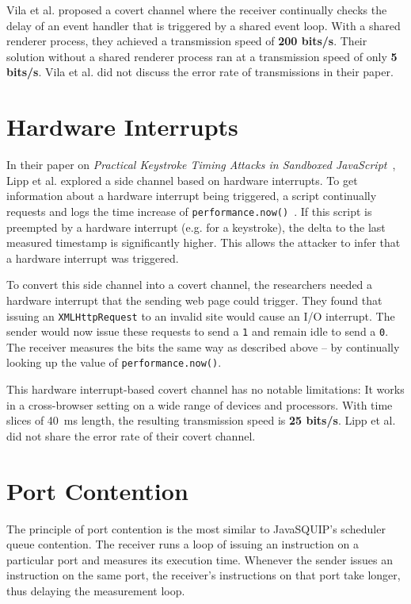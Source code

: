 \documentclass[11pt,
  titlepage=false,
  parskip=half,      %
]{scrreprt}
\begin{document}
Vila et al. proposed a covert channel where the receiver continually checks the delay of an event handler
that is triggered by a shared event loop.
With a shared renderer process, they achieved a transmission speed of \textbf{200 bits/s}.
Their solution without a shared renderer process ran at a transmission speed of only \textbf{5 bits/s}.
Vila et al. did not discuss the error rate of transmissions in their paper.

\section{Hardware Interrupts}
In their paper on \textit{Practical Keystroke Timing Attacks in Sandboxed JavaScript}~\cite{lipp2017practical},
Lipp et al. explored a side channel based on hardware interrupts.
To get information about a hardware interrupt being triggered,
a script continually requests and logs the time increase of \texttt{performance.now()}~\cite{performancenow}.
If this script is preempted by a hardware interrupt (e.g. for a keystroke),
the delta to the last measured timestamp is significantly higher.
This allows the attacker to infer that a hardware interrupt was triggered.

To convert this side channel into a covert channel,
the researchers needed a hardware interrupt that the sending web page could trigger.
They found that issuing an \texttt{XMLHttpRequest} to an invalid site would cause an I/O interrupt.
The sender would now issue these requests to send a \texttt{1} and remain idle to send a \texttt{0}.
The receiver measures the bits the same way as described above --
by continually looking up the value of \texttt{performance.now()}.

This hardware interrupt-based covert channel has no notable limitations:
It works in a cross-browser setting on a wide range of devices and processors.
With time slices of 40~ms length, the resulting transmission speed is \textbf{25 bits/s}.
Lipp et al. did not share the error rate of their covert channel.

\section{Port Contention}
The principle of port contention is the most similar to JavaSQUIP's scheduler queue contention.
The receiver runs a loop of issuing an instruction on a particular port and measures its execution time.
Whenever the sender issues an instruction on the same port, the receiver's instructions on that port take longer,
thus delaying the measurement loop.
\end{document}
